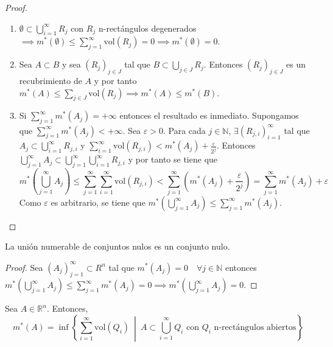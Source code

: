 \begin{proof}
    \leavevmode
    \begin{enumerate}
        \item $\emptyset \subset \bigcup_{i=1}^\infty R_j$ con $R_j$ n-rectángulos degenerados $\implies m^*(\emptyset) \leq \sum_{j=1}^\infty \text{vol}(R_j) = 0 \implies m^*(\emptyset) = 0$.
        \item Sea $A \subset B$ y sea $(R_j)_{j \in J}$ tal que $B \subset \bigcup_{j \in J}
                  R_j$. Entonces $(R_j)_{j \in J}$ es un recubrimiento de $A$ y por tanto $m^*(A)
                  \leq \sum_{j \in J} \text{vol}(R_j) \implies m^*(A) \leq m^*(B)$.
        \item Si $\sum_{j=1}^{\infty}{m^*(A_j)} = +\infty$ entonces el resultado es
              inmediato. Supongamos que $\sum_{j=1}^{\infty}{m^*(A_j)} < +\infty$. Sea
              $\varepsilon > 0$. Para cada $j \in \mathbb{N}$, $\exists (R_{j,i})_{i =
                      1}^\infty$ tal que $A_j \subset \bigcup_{i = 1}^\infty R_{j,i}$ y $\sum_{i =
                      1}^\infty \text{vol}(R_{j,i}) < m^*(A_j) + \frac{\varepsilon}{2^j}$. Entonces
              $\bigcup_{j=1}^{\infty} A_j \subset \bigcup_{j=1}^{\infty} \bigcup_{i =
                      1}^\infty R_{j,i}$ y por tanto se tiene que $$m^*\left(\bigcup_{j=1}^{\infty}
                  A_j\right) \leq \sum_{j=1}^{\infty} \sum_{i = 1}^\infty \text{vol}(R_{j,i}) <
                  \sum_{j=1}^{\infty} (m^*(A_j) + \frac{\varepsilon}{2^j}) = \sum_{j=1}^{\infty}
                  m^*(A_j) + \varepsilon$$ Como $\varepsilon$ es arbitrario, se tiene que
              $m^*(\bigcup_{j=1}^{\infty} A_j) \leq \sum_{j=1}^{\infty} m^*(A_j)$.
    \end{enumerate}
\end{proof}

\begin{corolario}
    La unión numerable de conjuntos nulos es un conjunto nulo.
\end{corolario}

\begin{proof}
    Sea $(A_j)_{j=1}^\infty \subset R^n$ tal que $m^*(A_j) = 0 \quad \forall j \in \mathbb{N}$ entonces $m^*(\bigcup_{j=1}^\infty A_j) \leq \sum_{j=1}^\infty m^*(A_j) = 0 \implies m^*(\bigcup_{j=1}^\infty A_j) = 0$.
\end{proof}

\begin{lema}
    Sea $A \in \mathbb{R}^n$. Entonces,
    \[
        m^*(A) = \inf \left\{ \sum_{i=1}^\infty \text{vol}(Q_i) \ \middle| \ A \subset \bigcup_{i=1}^\infty Q_i \text{ con } Q_i \text{ n-rectángulos abiertos} \right\}
    \]
\end{lema}

